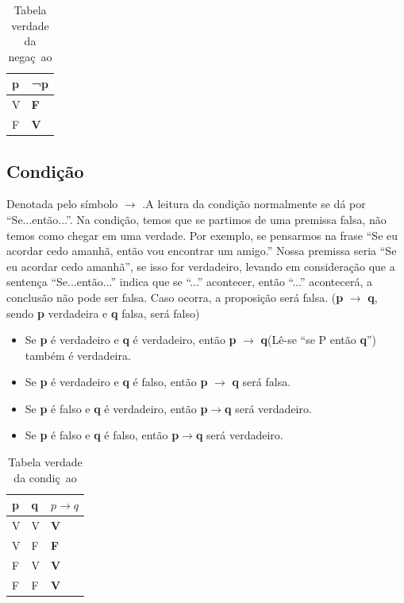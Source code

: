 \documentclass[a4paper,12pt,twoside,BCOR=10mm]{scrbook}
\begin{document}
\begin{titlepage}
\begin{table}[htb]
\centering
\caption{Tabela verdade da negaç~ao}
     \sffamily \begin{tabularx}{1.0\textwidth}{ p{5cm}  p{5cm}  }
    \hline
   \textbf{p} \hfill & ¬\textbf{p} \hfill  \\ \hline
    V & \textbf{F} \\
    F & \textbf{V} \\ \hline
    \end{tabularx} \normalfont
\label{table:Emissivity}
\end{table}


\subsection{Condição}
Denotada pelo símbolo $\rightarrow$ .A leitura da condição normalmente se dá por “Se...então...”. Na condição, temos que se partimos de uma premissa falsa, não temos como chegar em uma verdade. Por exemplo, se pensarmos na frase “Se eu acordar cedo amanhã, então vou encontrar um amigo.” Nossa premissa seria “Se eu acordar cedo amanhã”, se isso for verdadeiro, levando em consideração que a sentença “Se...então...” indica que se “...” acontecer, então “...” acontecerá, a conclusão não pode ser falsa. Caso ocorra, a proposição será falsa. (\textbf{p} $\rightarrow$ \textbf{q}, sendo \textbf{p} verdadeira e \textbf{q} falsa, será falso)

\begin{itemize}
\item Se \textbf{p} é verdadeiro e \textbf{q} é verdadeiro, então \textbf{p} $\rightarrow $ \textbf{q}(Lê-se “se P então \textbf{q}”) também é verdadeira.
\item Se \textbf{p} é verdadeiro e \textbf{q} é falso, então \textbf{p} $\rightarrow $ \textbf{q} será falsa.
\item Se \textbf{p} é falso e \textbf{q} é verdadeiro, então \textbf{p}$ \rightarrow $\textbf{q} será verdadeiro.
\item Se \textbf{p} é falso e \textbf{q} é falso, então \textbf{p}$ \rightarrow $\textbf{q} será verdadeiro. 
\end{itemize}


\begin{table}[htb]
\centering
\caption{Tabela verdade da condiç~ao}
     \sffamily \begin{tabularx}{1.0\textwidth}{ p{5cm}  p{5cm}  p{5cm} }
    \hline
   \textbf{p} \hfill & \textbf{q} \hfill & {$p \rightarrow q$} \\ \hline
    V & V & \textbf{V}\\
    V & F & \textbf{F}\\
    F & V & \textbf{V}\\
    F & F & \textbf{V}\\ \hline
    \end{tabularx} \normalfont
\label{table:Emissivity}
\end{table}



\end{titlepage}
\end{document}
